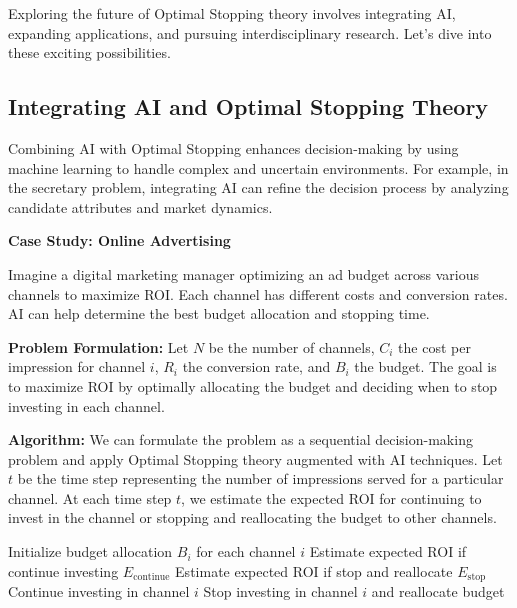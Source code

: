 \documentclass[12pt]{book} %
\begin{document}
Exploring the future of Optimal Stopping theory involves integrating AI, expanding applications, and pursuing interdisciplinary research. Let's dive into these exciting possibilities.

\subsection{Integrating AI and Optimal Stopping Theory}

Combining AI with Optimal Stopping enhances decision-making by using machine learning to handle complex and uncertain environments. For example, in the secretary problem, integrating AI can refine the decision process by analyzing candidate attributes and market dynamics.

\textbf{Case Study: Online Advertising}

Imagine a digital marketing manager optimizing an ad budget across various channels to maximize ROI. Each channel has different costs and conversion rates. AI can help determine the best budget allocation and stopping time.

\textbf{Problem Formulation:}
Let \(N\) be the number of channels, \(C_i\) the cost per impression for channel \(i\), \(R_i\) the conversion rate, and \(B_i\) the budget. The goal is to maximize ROI by optimally allocating the budget and deciding when to stop investing in each channel.


\textbf{Algorithm:}
We can formulate the problem as a sequential decision-making problem and apply Optimal Stopping theory augmented with AI techniques. Let \(t\) be the time step representing the number of impressions served for a particular channel. At each time step \(t\), we estimate the expected ROI for continuing to invest in the channel or stopping and reallocating the budget to other channels.
\FloatBarrier
\begin{algorithm}
\caption{AI-Optimal Stopping Algorithm for Online Advertising}
\begin{algorithmic}[1]
\State Initialize budget allocation $B_i$ for each channel $i$
        \State Estimate expected ROI if continue investing $E_{\text{continue}}$
        \State Estimate expected ROI if stop and reallocate $E_{\text{stop}}$
            \State Continue investing in channel $i$
        \Else
            \State Stop investing in channel $i$ and reallocate budget
        \EndIf
    \EndFor
\EndFor
\end{algorithmic}
\end{algorithm}
\FloatBarrier
\end{document}
